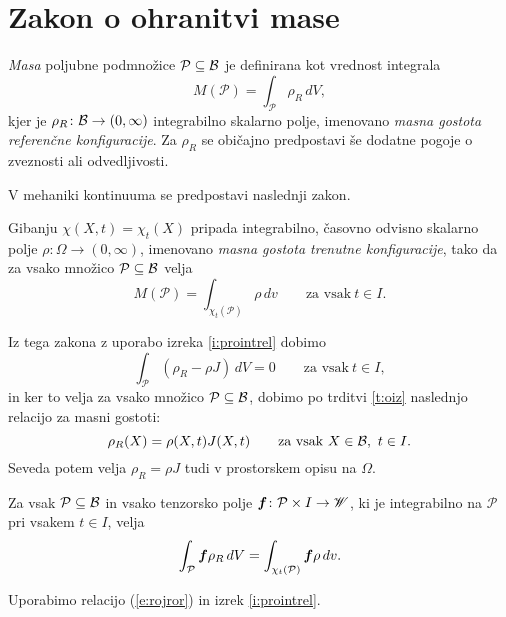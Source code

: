 \section{Zakon o ohranitvi mase}


\emph{Masa} poljubne podmnožice $\mathcal{P}\subseteq \mathcal B$ je definirana kot vrednost integrala
\[ M(\mathcal{P})=\int_{\mathcal{P}}\rho_R\,dV, \]
kjer je $\rho_R\colon \mathcal B\to(0,\infty)$ integrabilno skalarno polje, imenovano
\emph{masna gostota referenčne konfiguracije}.
Za $\rho_R$ se običajno predpostavi še dodatne pogoje o zveznosti ali odvedljivosti.

\begin{comment}
Poljubni konfiguraciji materialnega telesa $\kappa\colon B\to\E$ pripada
integrabilno skalarno polje $\rho_{\kappa}\colon B\to(0,\infty)$, imenovano
\emph{masna gostota konfiguracije $\kappa$}, tako da za vsako množico $P\subseteq B$ velja
\[ M(P)=\int_{\kappa(P)}\rho_{\kappa}\,dv. \]
\end{comment}

V mehaniki kontinuuma se predpostavi naslednji zakon.
\begin{ohmas}
	Gibanju $\chi(X,t)=\chi_t(X)$ pripada integrabilno, časovno odvisno skalarno polje
	$\rho\colon\Omega\to(0,\infty)$, imenovano \emph{masna gostota trenutne konfiguracije},
	tako da za vsako množico $\mathcal{P}\subseteq \mathcal B$ velja
	\[ M(\mathcal{P})=\int_{\chi_t(\mathcal{P})}\rho\,dv\qquad\textrm{za vsak}\ t\in I. \]
\end{ohmas}

Iz tega zakona z uporabo izreka \ref{i:prointrel} dobimo
\[ \int_{\mathcal{P}}(\rho_R-\rho J)\,dV=0 \qquad\textrm{za vsak}\ t\in I, \]
in ker to velja za vsako množico $\mathcal{P}\subseteq \mathcal B$, dobimo po trditvi \ref{t:oiz}
naslednjo relacijo za masni gostoti:
\begin{equation} \label{e:rojror}
	\rho_R(X)=\rho(X,t)J(X,t)\qquad\textrm{za vsak}\ X\in \mathcal B,\ t\in I.
\end{equation}
Seveda potem velja $\rho_R=\rho J$ tudi v prostorskem opisu na $\Omega$.

\begin{posledica} \label{p:roji}
	Za vsak $\mathcal{P}\subseteq \mathcal B$ in vsako
	tenzorsko polje $\boldsymbol f\colon \mathcal{P}\times I\to\mathscr W$, ki je integrabilno na $\mathcal{P}$
	pri vsakem $t\in I$, velja
	\[
		\int_{\mathcal{P}}\boldsymbol f\rho_R\,dV=\int_{\chi_t(\mathcal{P})}\boldsymbol f\rho\,dv.
	\]
\end{posledica}

\proof
	Uporabimo relacijo (\ref{e:rojror}) in izrek \ref{i:prointrel}.
\endproof

